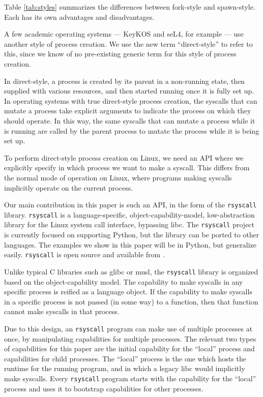 \documentclass[letterpaper,twocolumn,10pt]{article}
\begin{document}
Table \ref{tab:styles} summarizes the differences between fork-style and spawn-style.
Each has its own advantages and disadvantages.

A few academic operating systems
--- KeyKOS\cite{keykos} and seL4\cite{sel4}, for example ---
use another style of process creation\cite{exokernel}\cite{fuchsia}\cite{singularity}.
We use the new term ``direct-style'' to refer to this,
since we know of no pre-existing generic term for this style of process creation.

In direct-style, a process is created by its parent in a non-running state,
then supplied with various resources,
and then started running once it is fully set up.
In operating systems with true direct-style process creation,
the syscalls that can mutate a process
take explicit arguments to indicate the process on which they should operate\cite{keykos}\cite{sel4}.
In this way, the same syscalls that can mutate a process while it is running
are called by the parent process to mutate the process while it is being set up.

To perform direct-style process creation on Linux,
we need an API where we explicitly specify in which process we want to make a syscall.
This differs from the normal mode of operation on Linux,
where programs making syscalls implicitly operate on the current process.

Our main contribution in this paper is such an API, in the form of the \texttt{rsyscall} library.
\texttt{rsyscall} is a
language-specific, object-capability-model, low-abstraction library for the Linux system call interface,
bypassing libc\cite{capmyths}\cite{robust_composition}.
The \texttt{rsyscall} project is currently focused on supporting Python,
but the library can be ported to other languages.
The examples we show in this paper will be in Python,
but generalize easily.
\texttt{rsyscall} is open source and available from
\githuburl{}.

Unlike typical C libraries such as glibc or musl,
the \texttt{rsyscall} library is organized based on the object-capability model\cite{capmyths}\cite{robust_composition}.
The capability to make syscalls in any specific process is reified as a language object.
If the capability to make syscalls in a specific process is not passed (in some way) to a function,
then that function cannot make syscalls in that process.

Due to this design, an \texttt{rsyscall} program can make use of multiple processes at once,
by manipulating capabilities for multiple processes.
The relevant two types of capabilities for this paper are the initial capability for the ``local'' process
and capabilities for child processes.
The ``local'' process is the one which hosts the runtime for the running program,
and in which a legacy libc would implicitly make syscalls.
Every \texttt{rsyscall} program starts with the capability for the ``local'' process
and uses it to bootstrap capabilities for other processes.
\end{document}
